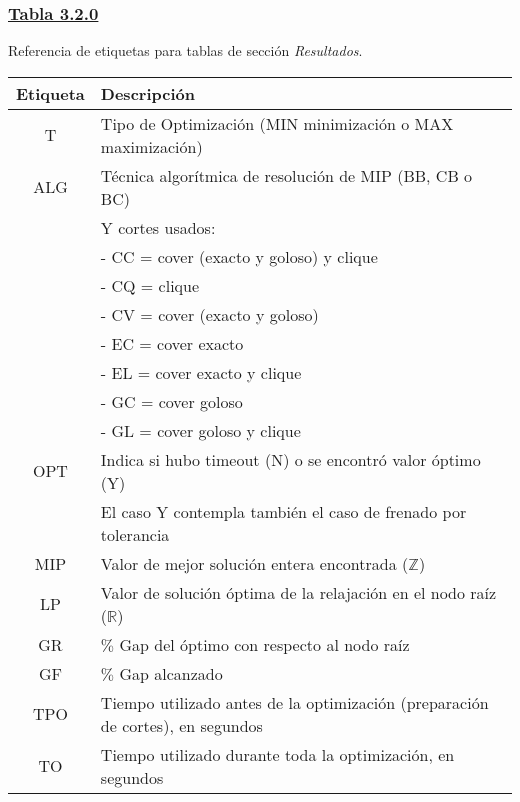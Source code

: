 \subsubsection*{\underline{Tabla 3.2.0}}

\noindent Referencia de etiquetas para tablas de sección \emph{Resultados}.\\

{
\centering
\begin{tabular}{c p{10cm}}
\\
\hline
\textbf{Etiqueta} & \textbf{Descripción}\\
\hline
T & Tipo de Optimización (MIN minimización o MAX maximización)\\
\hline
ALG & Técnica algorítmica de resolución de MIP (BB, CB o BC)\\
& Y cortes usados: \\
& \hspace{5mm} - CC = cover (exacto y goloso) y clique\\
& \hspace{5mm} -  CQ = clique\\
& \hspace{5mm} -  CV = cover (exacto y goloso)\\
& \hspace{5mm} -  EC = cover exacto\\
& \hspace{5mm} -  EL = cover exacto y clique\\
& \hspace{5mm} -  GC = cover goloso\\
& \hspace{5mm} -  GL = cover goloso y clique\\
\hline
OPT & Indica si hubo timeout (N) o se encontró valor óptimo (Y) \\
& El caso Y contempla también el caso de frenado por tolerancia\\
\hline
MIP & Valor de mejor solución entera encontrada ($\mathbb{Z}$)\\
\hline
LP & Valor de solución óptima de la relajación en el nodo raíz ($\mathbb{R}$)\\
\hline
GR & $\%$ Gap del óptimo con respecto al nodo raíz\\
\hline
GF & $\%$ Gap alcanzado\\
\hline
TPO & Tiempo utilizado antes de la optimización (preparación de cortes), en segundos\\
\hline
TO & Tiempo utilizado durante toda la optimización, en segundos\\

\end{tabular}}
